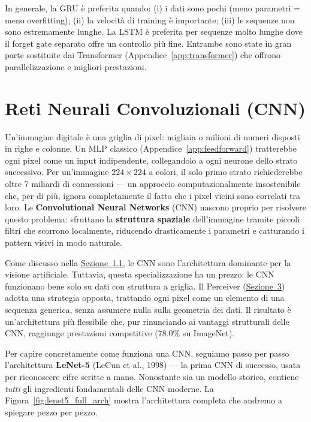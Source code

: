 \documentclass[12pt,a4paper]{article}
\begin{document}
\begin{notabox}
In generale, la GRU \`e preferita quando: (i) i dati sono pochi (meno parametri = meno overfitting); (ii) la velocit\`a di training \`e importante; (iii) le sequenze non sono estremamente lunghe. La LSTM \`e preferita per sequenze molto lunghe dove il forget gate separato offre un controllo pi\`u fine. Entrambe sono state in gran parte sostituite dai Transformer (Appendice~\ref{app:transformer}) che offrono parallelizzazione e migliori prestazioni.
\end{notabox}



\newpage
\section{Reti Neurali Convoluzionali (CNN)} \label{app:cnn}

Un'immagine digitale \`e una griglia di pixel: migliaia o milioni di numeri disposti in righe e colonne. Un MLP classico (Appendice~\ref{app:feedforward}) tratterebbe ogni pixel come un input indipendente, collegandolo a ogni neurone dello strato successivo. Per un'immagine $224 \times 224$ a colori, il solo primo strato richiederebbe oltre 7 miliardi di connessioni --- un approccio computazionalmente insostenibile che, per di pi\`u, ignora completamente il fatto che i pixel vicini sono correlati tra loro. Le \textbf{Convolutional Neural Networks} (CNN) nascono proprio per risolvere questo problema: sfruttano la \textbf{struttura spaziale} dell'immagine tramite piccoli filtri che scorrono localmente, riducendo drasticamente i parametri e catturando i pattern visivi in modo naturale.

Come discusso nella \hyperref[sec:specializzate]{Sezione~1.1}, le CNN sono l'architettura dominante per la visione artificiale. Tuttavia, questa specializzazione ha un prezzo: le CNN funzionano bene solo su dati con struttura a griglia. Il Perceiver (\hyperref[sec:architettura]{Sezione~3}) adotta una strategia opposta, trattando ogni pixel come un elemento di una sequenza generica, senza assumere nulla sulla geometria dei dati. Il risultato \`e un'architettura pi\`u flessibile che, pur rinunciando ai vantaggi strutturali delle CNN, raggiunge prestazioni competitive (78.0\% su ImageNet).

Per capire concretamente come funziona una CNN, seguiamo passo per passo l'architettura \textbf{LeNet-5} (LeCun et al., 1998) --- la prima CNN di successo, usata per riconoscere cifre scritte a mano. Nonostante sia un modello storico, contiene \emph{tutti} gli ingredienti fondamentali delle CNN moderne. La Figura~\ref{fig:lenet5_full_arch} mostra l'architettura completa che andremo a spiegare pezzo per pezzo.
\end{document}
